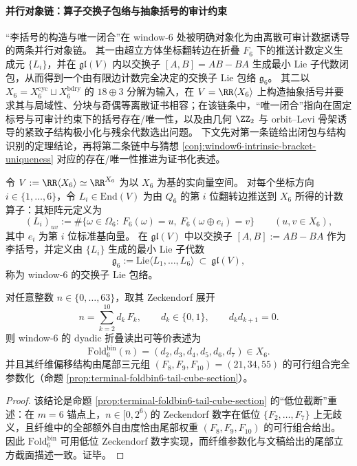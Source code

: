 
\paragraph{并行对象链：算子交换子包络与抽象括号的审计约束}
“李括号的构造与唯一闭合”在 window-\(6\) 处被明确对象化为由离散可审计数据诱导的两条并行对象链。
其一由超立方体坐标翻转边在折叠 \(F_6\) 下的推送计数定义生成元 \(\{L_i\}\)，并在 \(\mathfrak{gl}(V)\) 内以交换子 \([A,B]=AB-BA\) 生成最小 Lie 子代数闭包，从而得到一个由有限边计数完全决定的交换子 Lie 包络 \(\mathfrak{g}_6\)。
其二以 \(X_6=X^{\mathrm{cyc}}_6\sqcup X^{\mathrm{bdry}}_6\) 的 \(18\oplus 3\) 分解为输入，在 \(V=\RR\langle X_6\rangle\) 上构造抽象括号并要求其与局域性、分块与奇偶等离散证书相容；在该链条中，“唯一闭合”指向在固定标号与可审计约束下的括号存在/唯一性，以及由几何 \(\ZZ_2\) 与 orbit--Levi 骨架诱导的紧致子结构极小化与残余代数选出问题。
下文先对第一条链给出闭包与结构识别的定理结论，再将第二条链中与猜想 \ref{conj:window6-intrinsic-bracket-uniqueness} 对应的存在/唯一性推进为证书化表述。

\begin{definition}\label{def:window6-coordinate-pushforward-lie-envelope}
令 \(V:=\RR\langle X_6\rangle\simeq \RR^{X_6}\) 为以 \(X_6\) 为基的实向量空间。
对每个坐标方向 \(i\in\{1,\dots,6\}\)，令 \(L_i\in \mathrm{End}(V)\) 为由 \(Q_6\) 的第 \(i\) 位翻转边推送到 \(X_6\) 所得的计数算子：其矩阵元定义为
\[
(L_i)_{uv}:=\#\bigl\{\omega\in\Omega_6:\ F_6(\omega)=u,\ F_6(\omega\oplus e_i)=v\bigr\}
\qquad (u,v\in X_6),
\]
其中 \(e_i\) 为第 \(i\) 位标准基向量。
在 \(\mathfrak{gl}(V)\) 中以交换子
\(
[A,B]:=AB-BA
\)
作为李括号，并定义由 \(\{L_i\}\) 生成的最小 Lie 子代数
\[
\mathfrak{g}_6:=\mathrm{Lie}\langle L_1,\dots,L_6\rangle\ \subset\ \mathfrak{gl}(V),
\]
称为 window-\(6\) 的交换子 Lie 包络。
\end{definition}

\begin{lemma}\label{lem:window6-foldbin6-zeckendorf-lowbit-projection}
对任意整数 \(n\in\{0,\dots,63\}\)，取其 Zeckendorf 展开
\[
n=\sum_{k=2}^{10} d_k\,F_k,
\qquad
d_k\in\{0,1\},
\qquad
d_kd_{k+1}=0.
\]
则 window-\(6\) 的 dyadic 折叠读出可等价表述为
\[
\mathrm{Fold}^{\mathrm{bin}}_6(n)=(d_2,d_3,d_4,d_5,d_6,d_7)\in X_6.
\]
并且其纤维偏移结构由尾部三元组 \((F_8,F_9,F_{10})=(21,34,55)\) 的可行组合完全参数化（命题 \ref{prop:terminal-foldbin6-tail-cube-section}）。
\end{lemma}
\begin{proof}
该结论是命题 \ref{prop:terminal-foldbin6-tail-cube-section} 的“低位截断”重述：在 \(m=6\) 锚点上，\(n\in[0,2^6)\) 的 Zeckendorf 数字在低位 \(\{F_2,\dots,F_7\}\) 上无歧义，且纤维中的全部额外自由度恰由尾部权重 \((F_8,F_9,F_{10})\) 的可行组合给出。
因此 \(\mathrm{Fold}^{\mathrm{bin}}_6\) 可用低位 Zeckendorf 数字实现，而纤维参数化与文稿给出的尾部立方截面描述一致。证毕。
\end{proof}

